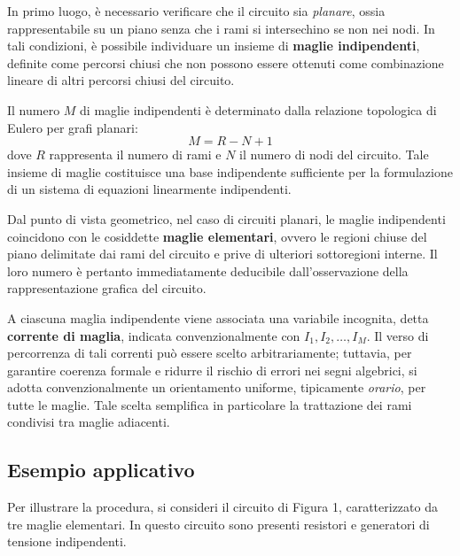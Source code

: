 In primo luogo, è necessario verificare che il circuito sia \emph{planare}, ossia rappresentabile su un piano senza che i rami si intersechino se non nei nodi. In tali condizioni, è possibile individuare un insieme di \textbf{maglie indipendenti}, definite come percorsi chiusi che non possono essere ottenuti come combinazione lineare di altri percorsi chiusi del circuito.

Il numero \(M\) di maglie indipendenti è determinato dalla relazione topologica di Eulero per grafi planari:
\begin{equation}
M = R - N + 1
\label{eq:topologia}
\end{equation}
dove \(R\) rappresenta il numero di rami e \(N\) il numero di nodi del circuito. Tale insieme di maglie costituisce una base indipendente sufficiente per la formulazione di un sistema di equazioni linearmente indipendenti.

Dal punto di vista geometrico, nel caso di circuiti planari, le maglie indipendenti coincidono con le cosiddette \textbf{maglie elementari}, ovvero le regioni chiuse del piano delimitate dai rami del circuito e prive di ulteriori sottoregioni interne. Il loro numero è pertanto immediatamente deducibile dall'osservazione della rappresentazione grafica del circuito.

A ciascuna maglia indipendente viene associata una variabile incognita, detta \textbf{corrente di maglia}, indicata convenzionalmente con \(I_1, I_2, \dots, I_M\). Il verso di percorrenza di tali correnti può essere scelto arbitrariamente; tuttavia, per garantire coerenza formale e ridurre il rischio di errori nei segni algebrici, si adotta convenzionalmente un orientamento uniforme, tipicamente \emph{orario}, per tutte le maglie. Tale scelta semplifica in particolare la trattazione dei rami condivisi tra maglie adiacenti.

\subsection*{\Large{Esempio applicativo}}
Per illustrare la procedura, si consideri il circuito di Figura 1, caratterizzato da tre maglie elementari. In questo circuito sono presenti resistori e generatori di tensione indipendenti.



